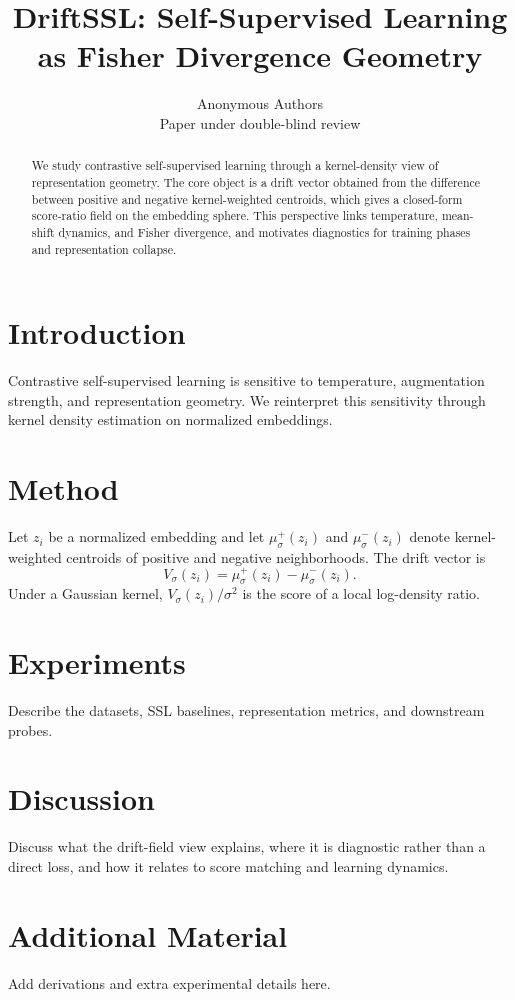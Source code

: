 \documentclass{article}
\title{DriftSSL: Self-Supervised Learning as Fisher Divergence Geometry}
\author{Anonymous Authors\\
Paper under double-blind review}
\begin{document}
\maketitle

\begin{abstract}
We study contrastive self-supervised learning through a kernel-density view of representation geometry. The core object is a drift vector obtained from the difference between positive and negative kernel-weighted centroids, which gives a closed-form score-ratio field on the embedding sphere. This perspective links temperature, mean-shift dynamics, and Fisher divergence, and motivates diagnostics for training phases and representation collapse.
\end{abstract}

\section{Introduction}

Contrastive self-supervised learning is sensitive to temperature, augmentation strength, and representation geometry. We reinterpret this sensitivity through kernel density estimation on normalized embeddings.

\section{Method}

Let $z_i$ be a normalized embedding and let $\mu^+_\sigma(z_i)$ and $\mu^-_\sigma(z_i)$ denote kernel-weighted centroids of positive and negative neighborhoods. The drift vector is
$$
V_\sigma(z_i) = \mu^+_\sigma(z_i) - \mu^-_\sigma(z_i).
$$
Under a Gaussian kernel, $V_\sigma(z_i) / \sigma^2$ is the score of a local log-density ratio.

\section{Experiments}

Describe the datasets, SSL baselines, representation metrics, and downstream probes.

\section{Discussion}

Discuss what the drift-field view explains, where it is diagnostic rather than a direct loss, and how it relates to score matching and learning dynamics.




\appendix
\section{Additional Material}

Add derivations and extra experimental details here.
\end{document}

